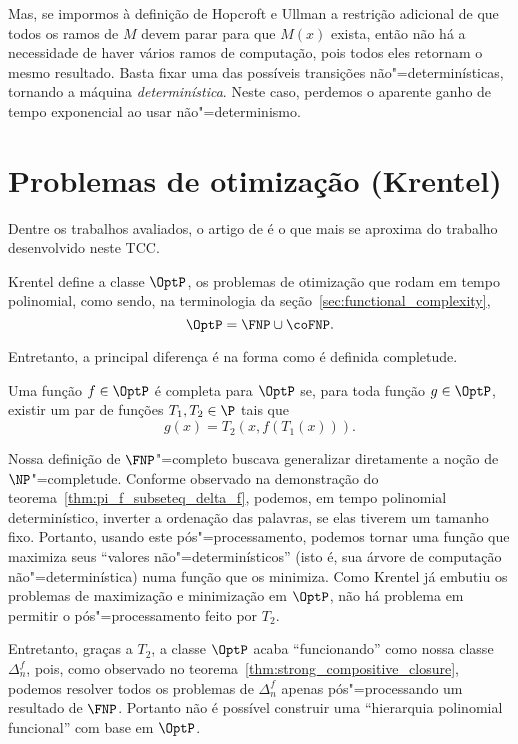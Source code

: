Mas,
se impormos à definição de Hopcroft e Ullman a restrição adicional
de que todos os ramos de $M$ devem parar para que $M(x)$ exista,
então não há a necessidade de haver vários ramos de computação,
pois todos eles retornam o mesmo resultado.
Basta fixar uma das possíveis transições não"=determinísticas,
tornando a máquina \emph{determinística}.
Neste caso,
perdemos o aparente ganho de tempo exponencial ao usar não"=determinismo.

\section{Problemas de otimização (Krentel)}

Dentre os trabalhos avaliados,
o artigo de 
é o que mais se aproxima do trabalho desenvolvido neste TCC.

Krentel define a classe $\OptP$,
os problemas de otimização que rodam em tempo polinomial,
como sendo,
na terminologia da seção~\ref{sec:functional_complexity},
\begin{equation*}
    \OptP = \FNP \cup \coFNP.
\end{equation*}

Entretanto,
a principal diferença é na forma como é definida completude.
\begin{definition}
    Uma função $f \in \OptP$ é completa para $\OptP$
    se, para toda função $g \in \OptP$,
    existir um par de funções $T_1, T_2 \in \P$
    tais que
    \begin{equation*}
        g(x) = T_2( x, f(T_1(x)) ).
    \end{equation*}
\end{definition}

Nossa definição de $\FNP$"=completo
buscava generalizar diretamente a noção de $\NP$"=completude.
Conforme observado na demonstração do teorema~\ref{thm:pi_f_subseteq_delta_f},
podemos, em tempo polinomial determinístico,
inverter a ordenação das palavras, se elas tiverem um tamanho fixo.
Portanto,
usando este pós"=processamento,
podemos tornar uma função que maximiza seus ``valores não"=determinísticos''
(isto é, sua árvore de computação não"=determinística)
numa função que os minimiza.
Como Krentel já embutiu os problemas de maximização e minimização em $\OptP$,
não há problema em permitir o pós"=processamento feito por $T_2$.

Entretanto,
graças a $T_2$,
a classe $\OptP$ acaba ``funcionando'' como nossa classe $\Delta_n^f$,
pois,
como observado no teorema~\ref{thm:strong_compositive_closure},
podemos resolver todos os problemas de $\Delta_n^f$
apenas pós"=processando um resultado de $\FNP$.
Portanto não é possível construir uma ``hierarquia polinomial funcional''
com base em $\OptP$.

